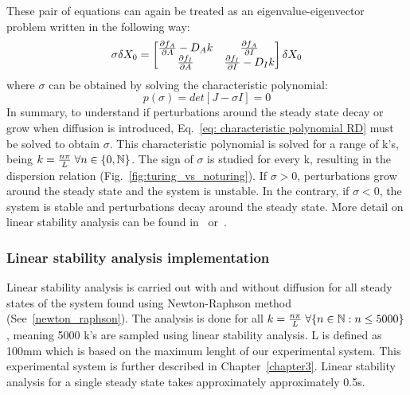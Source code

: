 These pair of equations can again be treated as an eigenvalue-eigenvector problem written in the following way:
\begin{equation}
    \sigma \delta X_{0} = \begin{bmatrix}
                              \pdv{f_{A}}{A} - D_{A}k &
                              \pdv{f_{A}}{I}  \\
                              \pdv{f_{I}}{A} &
                              \pdv{f_{I}}{I} - D_{I}k
    \end{bmatrix}\delta X_{0}
    \label{eq: jacobian RD}
\end{equation}
where $\sigma$ can be obtained by solving the characteristic polynomial:
\begin{equation}
    p(\sigma) = det[J-\sigma I] = 0
    \label{eq: characteristic polynomial RD}
\end{equation}
In summary, to understand if perturbations around the steady state decay or grow when diffusion is introduced, Eq.~\ref{eq: characteristic polynomial RD} must be solved to obtain $\sigma$.
This characteristic polynomial is solved for a range of k's, being $k=\frac{n\pi}{L} \hspace{0.1cm}\forall n \in \{0, \mathbb{N}\} $.
The sign of $\sigma$ is studied for every k, resulting in the dispersion relation (Fig.~\ref{fig:turing_vs_noturing}).
If $\sigma > 0$, perturbations grow around the steady state and the system is unstable.
In the contrary, if  $\sigma < 0$, the system is stable and perturbations decay around the steady state.
More detail on linear stability analysis can be found in~\cite{J.DMurray2002} or~\cite{Glendinning1994}.
\subsubsection{Linear stability analysis implementation}
Linear stability analysis is carried out with and without diffusion for all steady states of the system found using Newton-Raphson method (See~\ref{newton_raphson}).
The analysis is done for all $k=\frac{n\pi}{L} \hspace{0.1cm}\forall \{n \in \mathbb{N} : n \leq 5000\} $, meaning 5000 k's are sampled using linear stability analysis.
L is defined as 100mm which is based on the maximum lenght of our experimental system.
This experimental system is further described in Chapter~\ref{chapter3}.
Linear stability analysis for a single steady state takes approximately approximately 0.5s.

